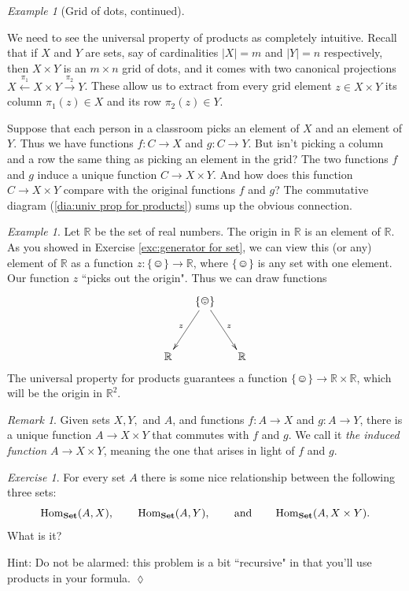 \documentclass{book}
\def\tn{\textnormal}
\def\RR{{\mathbb R}}
\def\Hom{\tn{Hom}}
\def\hsp{\hspace{.3in}}
\def\singleton{\{\smiley\}}
\def\to{\rightarrow}
\def\taking{\colon}
\newcommand{\To}[1]{\xrightarrow{#1}}
\newcommand{\From}[1]{\xleftarrow{#1}}
\def\Set{{\bf Set}}
\theoremstyle{remark}
\newtheorem{remark}[subsubsection]{Remark}
\newtheorem{example}[subsubsection]{Example}
\newtheorem{exc}[subsubsection]{Exercise}
\newenvironment{exercise}{\begin{exc}}{\hspace*{\fill}$\lozenge$\end{exc}}
\theoremstyle{definition}
\begin{document}
\begin{example}[Grid of dots, continued]\label{ex:grid2}

We need to see the universal property of products as completely intuitive. Recall that if $X$ and $Y$ are sets, say of cardinalities $|X|=m$ and $|Y|=n$ respectively, then $X\times Y$ is an $m\times n$ grid of dots, and it comes with two canonical projections $X\From{\pi_1}X\times Y\To{\pi_2}Y$. These allow us to extract from every grid element $z\in X\times Y$ its column $\pi_1(z)\in X$ and its row $\pi_2(z)\in Y$.

Suppose that each person in a classroom picks an element of $X$ and an element of $Y$. Thus we have functions $f\taking C\to X$ and $g\taking C\to Y$. But isn't picking a column and a row the same thing as picking an element in the grid? The two functions $f$ and $g$ induce a unique function $C\to X\times Y$. And how does this function $C\to X\times Y$ compare with the original functions $f$ and $g$? The commutative diagram (\ref{dia:univ prop for products}) sums up the obvious connection. 

\end{example}

\begin{example}

Let $\RR$ be the set of real numbers. The origin in $\RR$ is an element of $\RR$. As you showed in Exercise \ref{exc:generator for set}, we can view this (or any) element of $\RR$ as a function $z\taking\singleton\to\RR$, where $\singleton$ is any set with one element. Our function $z$ ``picks out the origin". Thus we can draw functions 
$$\xymatrix@=15pt{&\singleton\ar[ddr]^z\ar[ddl]_z\\\\\RR&&\RR}
$$
The universal property for products guarantees a function $\singleton\to\RR\times\RR$, which will be the origin in $\RR^2.$

\end{example}

\begin{remark}

Given sets $X, Y,$ and $A$, and functions $f\taking A\to X$ and $g\taking A\to Y$, there is a unique function $A\to X\times Y$ that commutes with $f$ and $g$. We call it {\em the induced function $A\to X\times Y$}, meaning the one that arises in light of $f$ and $g$.

\end{remark}

\begin{exercise}
For every set $A$ there is some nice relationship between the following three sets: $$\Hom_{\Set}(A,X), \hsp \Hom_\Set(A,Y), \hsp \text{and} \hsp\Hom_\Set(A,X\times Y).$$ What is it?

Hint: Do not be alarmed: this problem is a bit ``recursive" in that you'll use products in your formula.
\end{exercise}
\end{document}
